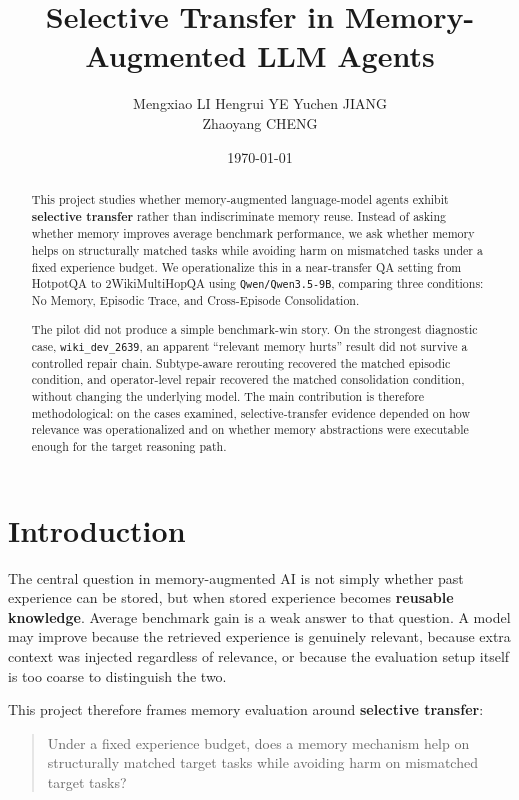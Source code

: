 \documentclass[11pt]{article}
\title{\vspace{-0.6em}\textbf{Selective Transfer in Memory-Augmented LLM Agents}\\[0.3em]
\large}
\author{Mengxiao LI \quad Hengrui YE \quad Yuchen JIANG \\ Zhaoyang CHENG}
\date{\vspace{-0.3em}\today}
\begin{document}
\sloppy

\maketitle

\begin{abstract}
This project studies whether memory-augmented language-model agents exhibit \textbf{selective transfer} rather than indiscriminate memory reuse. Instead of asking whether memory improves average benchmark performance, we ask whether memory helps on structurally matched tasks while avoiding harm on mismatched tasks under a fixed experience budget. We operationalize this in a near-transfer QA setting from HotpotQA to 2WikiMultiHopQA using \texttt{Qwen/Qwen3.5-9B}, comparing three conditions: No Memory, Episodic Trace, and Cross-Episode Consolidation.

The pilot did not produce a simple benchmark-win story. On the strongest diagnostic case, \texttt{wiki\_dev\_2639}, an apparent ``relevant memory hurts'' result did not survive a controlled repair chain. Subtype-aware rerouting recovered the matched episodic condition, and operator-level repair recovered the matched consolidation condition, without changing the underlying model. The main contribution is therefore methodological: on the cases examined, selective-transfer evidence depended on how relevance was operationalized and on whether memory abstractions were executable enough for the target reasoning path.
\end{abstract}

\section{Introduction}

The central question in memory-augmented AI is not simply whether past experience can be stored, but when stored experience becomes \textbf{reusable knowledge}. Average benchmark gain is a weak answer to that question. A model may improve because the retrieved experience is genuinely relevant, because extra context was injected regardless of relevance, or because the evaluation setup itself is too coarse to distinguish the two.

This project therefore frames memory evaluation around \textbf{selective transfer}:

\begin{quote}
Under a fixed experience budget, does a memory mechanism help on structurally matched target tasks while avoiding harm on mismatched target tasks?
\end{quote}
\end{document}
